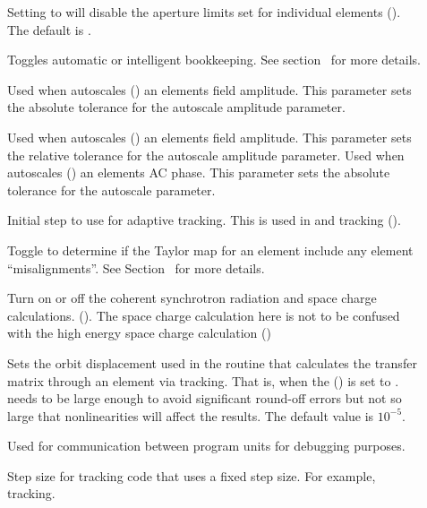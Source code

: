 {\begin{description}
%
\item[] \Newline
Setting  to  will disable the aperture limits set for individual
elements (). The default is .
%
\item[] \Newline
Toggles automatic or intelligent bookkeeping. See
section~ for more details.
%
\item[] \Newline
Used when \bmad autoscales () an elements field amplitude. This parameter sets the
absolute tolerance for the autoscale amplitude parameter.
%
\item[] \Newline
Used when \bmad autoscales () an elements field amplitude. This parameter sets the
relative tolerance for the autoscale amplitude parameter.
%
Used when \bmad autoscales () an elements AC phase. This parameter sets the
absolute tolerance for the autoscale parameter.
%
\item[] \Newline
\item[] \Newline
Initial step to use for adaptive tracking. This is used in
 and  tracking ().
%
\item[] \Newline
Toggle to determine if the Taylor map for an element include any
element ``misalignments''.  See Section~ for more
details.
%
\item[] \Newline
Turn on or off the coherent synchrotron radiation and space charge calculations. ().
The space charge calculation here is not to be confused with the high energy space charge
calculation ()
%
\item[] \Newline 
Sets the orbit displacement used in the routine that calculates the transfer matrix through an
element via tracking. That is, when the  () is set to
.  needs to be large enough to avoid significant round-off errors but not so
large that nonlinearities will affect the results. The default value is $10^{-5}$.
%
\item[] \Newline
Used for communication between program units for debugging purposes.
%
\item[] \Newline
Step size for tracking code  that uses a fixed step
size. For example,  tracking.

\end{description}}
